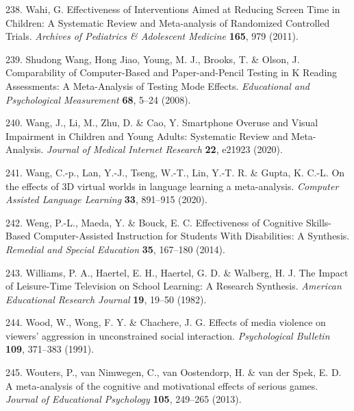 \documentclass[
  english,
  man]{apa6}
\newenvironment{cslreferences}%
  {}%
  {\par}
\begin{document}
\begin{cslreferences}
\leavevmode\hypertarget{ref-wahiEffectivenessInterventionsAimed2011}{}%
238. Wahi, G. Effectiveness of Interventions Aimed at Reducing Screen Time in Children: A Systematic Review and Meta-analysis of Randomized Controlled Trials. \emph{Archives of Pediatrics \& Adolescent Medicine} \textbf{165}, 979 (2011).

\leavevmode\hypertarget{ref-shudongwangComparabilityComputerBasedPaperandPencil2008}{}%
239. Shudong Wang, Hong Jiao, Young, M. J., Brooks, T. \& Olson, J. Comparability of Computer-Based and Paper-and-Pencil Testing in K Reading Assessments: A Meta-Analysis of Testing Mode Effects. \emph{Educational and Psychological Measurement} \textbf{68}, 5--24 (2008).

\leavevmode\hypertarget{ref-wangSmartphoneOveruseVisual2020}{}%
240. Wang, J., Li, M., Zhu, D. \& Cao, Y. Smartphone Overuse and Visual Impairment in Children and Young Adults: Systematic Review and Meta-Analysis. \emph{Journal of Medical Internet Research} \textbf{22}, e21923 (2020).

\leavevmode\hypertarget{ref-wangEffects3DVirtual2020}{}%
241. Wang, C.-p., Lan, Y.-J., Tseng, W.-T., Lin, Y.-T. R. \& Gupta, K. C.-L. On the effects of 3D virtual worlds in language learning a meta-analysis. \emph{Computer Assisted Language Learning} \textbf{33}, 891--915 (2020).

\leavevmode\hypertarget{ref-wengEffectivenessCognitiveSkillsbased2014}{}%
242. Weng, P.-L., Maeda, Y. \& Bouck, E. C. Effectiveness of Cognitive Skills-Based Computer-Assisted Instruction for Students With Disabilities: A Synthesis. \emph{Remedial and Special Education} \textbf{35}, 167--180 (2014).

\leavevmode\hypertarget{ref-williamsImpactLeisuretimeTelevision1982}{}%
243. Williams, P. A., Haertel, E. H., Haertel, G. D. \& Walberg, H. J. The Impact of Leisure-Time Television on School Learning: A Research Synthesis. \emph{American Educational Research Journal} \textbf{19}, 19--50 (1982).

\leavevmode\hypertarget{ref-woodEffectsMediaViolence1991}{}%
244. Wood, W., Wong, F. Y. \& Chachere, J. G. Effects of media violence on viewers' aggression in unconstrained social interaction. \emph{Psychological Bulletin} \textbf{109}, 371--383 (1991).

\leavevmode\hypertarget{ref-woutersMetaanalysisCognitiveMotivational2013}{}%
245. Wouters, P., van Nimwegen, C., van Oostendorp, H. \& van der Spek, E. D. A meta-analysis of the cognitive and motivational effects of serious games. \emph{Journal of Educational Psychology} \textbf{105}, 249--265 (2013).


\end{cslreferences}
\end{document}
